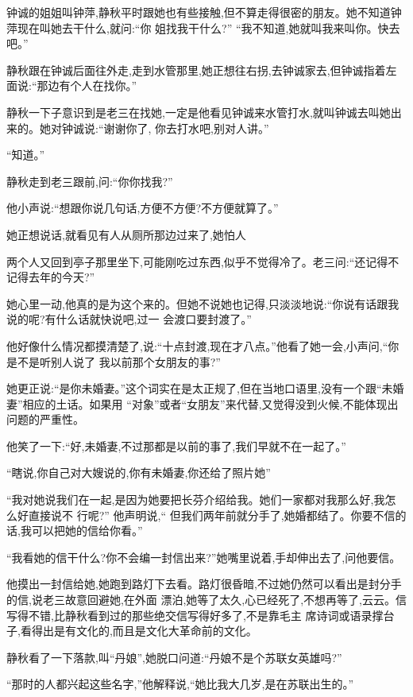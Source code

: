﻿\documentclass[12pt]{article}
\begin{document}
钟诚的姐姐叫钟萍,静秋平时跟她也有些接触,但不算走得很密的朋友。她不知道钟萍现在叫她去干什么,就问:``你
姐找我干什么?'' ``我不知道,她就叫我来叫你。快去吧。''

静秋跟在钟诚后面往外走,走到水管那里,她正想往右拐,去钟诚家去,但钟诚指着左面说:``那边有个人在找你。''

静秋一下子意识到是老三在找她,一定是他看见钟诚来水管打水,就叫钟诚去叫她出来的。她对钟诚说:``谢谢你了,
你去打水吧,别对人讲。''

``知道。''

静秋走到老三跟前,问:``你\myrule 你\myrule 找我?''

他小声说:``想跟你说几句话,方便不方便?不方便就算了。''

她正想说话,就看见有人从厕所那边过来了,她怕人


两个人又回到亭子那里坐下,可能刚吃过东西,似乎不觉得冷了。老三问:``还记得不记得去年的今天?''

她心里一动,他真的是为这个来的。但她不说她也记得,只淡淡地说:``你说有话跟我说的呢?有什么话就快说吧,过一
会渡口要封渡了。''

他好像什么情况都摸清楚了,说:``十点封渡,现在才八点。''他看了她一会,小声问,``你是不是听别人说了\myrule 
我以前那个女朋友的事?''

她更正说:``是你未婚妻。''这个词实在是太正规了,但在当地口语里,没有一个跟``未婚妻''相应的土话。如果用
``对象''或者``女朋友''来代替,又觉得没到火候,不能体现出问题的严重性。

他笑了一下:``好,未婚妻,不过那都是以前的事了\myrule ,我们早就\myrule 不在一起了。''

``瞎说,你自己对大嫂说的,你有未婚妻,你还给了照片她\myrule ''

``我对她说我们在一起,是因为她\myrule 要把长芬介绍给我。她们一家都对我那么好,我怎么好\myrule 直接说不
行呢?'' 他声明说,`` 但我们两年前就分手了,她\myrule 婚都结了。你要不信的话,我可以把她的信给你看。''

``我看她的信干什么?你不会编一封信出来?''她嘴里说着,手却伸出去了,问他要信。

他摸出一封信给她,她跑到路灯下去看。路灯很昏暗,不过她仍然可以看出是封分手的信,说老三故意回避她,在外面
漂泊,她等了太久,心已经死了,不想再等了,云云。信写得不错,比静秋看到过的那些绝交信写得好多了,不是靠毛主
席诗词或语录撑台子,看得出是有文化的,而且是文化大革命前的文化。

静秋看了一下落款,叫``丹娘'',她脱口问道:``丹娘不是个苏联女英雄吗?''

``那时的人都兴起这些名字,''他解释说,``她比我大几岁,是在苏联出生的。''
\end{document}
